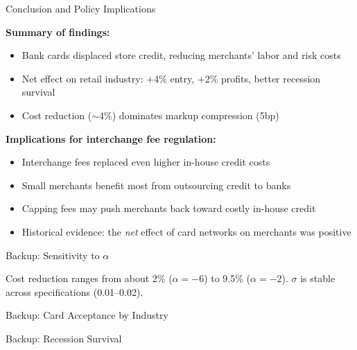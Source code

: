 \documentclass[11pt, aspectratio=169]{beamer}
\begin{document}
\begin{frame}{Conclusion and Policy Implications}

\textbf{Summary of findings:}
\begin{itemize}
    \item Bank cards displaced store credit, reducing merchants' labor and risk costs
    \item Net effect on retail industry: $+$4\% entry, $+$2\% profits, better recession survival
    \item Cost reduction ($\sim$4\%) dominates markup compression (5bp)
\end{itemize}

\vfill

\textbf{Implications for interchange fee regulation:}
\begin{itemize}
    \item Interchange fees replaced even higher in-house credit costs
    \item Small merchants benefit most from outsourcing credit to banks
    \item Capping fees may push merchants back toward costly in-house credit
    \item Historical evidence: the \emph{net} effect of card networks on merchants was positive
\end{itemize}

\end{frame}


\appendix

\begin{frame}[noframenumbering]{Backup: Sensitivity to $\alpha$}
\centering


\small Cost reduction ranges from about 2\% ($\alpha = -6$) to 9.5\% ($\alpha = -2$). $\sigma$ is stable across specifications (0.01--0.02).
\end{frame}

\begin{frame}[noframenumbering]{Backup: Card Acceptance by Industry}
\centering
\small

\end{frame}

\begin{frame}[noframenumbering]{Backup: Recession Survival}
\tiny

\end{frame}
\end{document}
